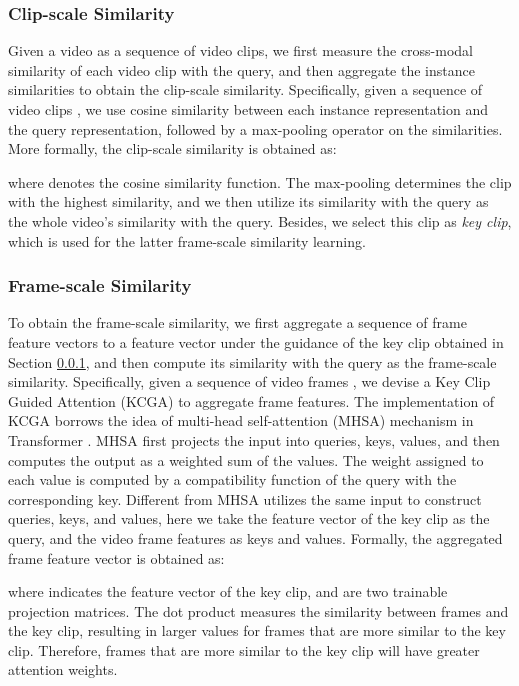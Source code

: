 \documentclass[sigconf]{acmart}
\begin{document}
\subsubsection{Clip-scale Similarity}\label{ssec:clip}
Given a video as a sequence of video clips, we first measure the cross-modal similarity of each video clip with the query, and then aggregate the instance similarities to obtain the clip-scale similarity.
Specifically, given a sequence of video clips , 
we use cosine similarity between each instance representation and the query representation, followed by a max-pooling operator on the similarities. More formally, the clip-scale similarity is obtained as:

where  denotes the cosine similarity function.
The max-pooling determines the clip with the highest similarity, and we then utilize its similarity with the query as the whole video's similarity with the query. Besides, we select this clip as \emph{key clip}, which is used for the latter frame-scale similarity learning.


\subsubsection{Frame-scale Similarity}
To obtain the frame-scale similarity, we first aggregate a sequence of frame feature vectors to a feature vector under the guidance of the key clip obtained in Section \ref{ssec:clip}, and then compute its similarity with the query as the frame-scale similarity. 
Specifically, given a sequence of video frames , we devise a Key Clip Guided Attention (KCGA) to aggregate frame features.
The implementation of KCGA borrows the idea of multi-head self-attention (MHSA) mechanism in Transformer \cite{vaswani2017attention}.
MHSA first projects the input into queries, keys, values, and then computes the output as a weighted sum of the values. The weight assigned to each value is computed by a compatibility function of the query with the corresponding key.
Different from MHSA utilizes the same input to construct queries, keys, and values, here we take the feature vector of the key clip as the query, and the video frame features as keys and values. Formally, the aggregated frame feature vector is obtained as:

where  indicates the feature vector of the key clip,  and  are two trainable projection matrices.
The dot product measures the similarity between frames and the key clip, resulting in larger values for frames that are more similar to the key clip. Therefore, frames that are more similar to the key clip will have greater attention weights.
\end{document}
